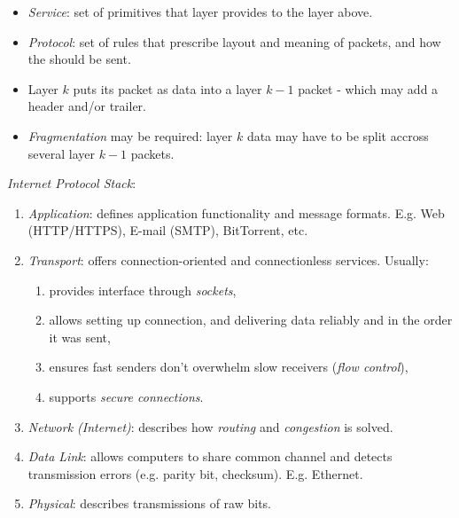 \documentclass[twocolumn,english]{article}
\begin{document}
\begin{itemize}
\item \emph{Service}: set of primitives that layer provides to the layer
above.
\item \emph{Protocol}: set of rules that prescribe layout and meaning of
packets, and how the should be sent.
\item Layer $k$ puts its packet as data into a layer $k-1$ packet - which
may add a header and/or trailer.
\item \emph{Fragmentation} may be required: layer $k$ data may have to
be split accross several layer $k-1$ packets.
\end{itemize}
\emph{Internet Protocol Stack}:
\begin{enumerate}
\item \emph{Application}: defines application functionality and message
formats. E.g. Web (HTTP/HTTPS), E-mail (SMTP), BitTorrent, etc.
\item \emph{Transport}: offers connection-oriented and connectionless services.
Usually:
\begin{enumerate}
\item provides interface through \emph{sockets}, 
\item allows setting up connection, and delivering data reliably and in
the order it was sent,
\item ensures fast senders don't overwhelm slow receivers (\emph{flow control}),
\item supports \emph{secure connections}.
\end{enumerate}
\item \emph{Network (Internet)}: describes how \emph{routing} and \emph{congestion}
is solved.
\item \emph{Data Link}: allows computers to share common channel and detects
transmission errors (e.g. parity bit, checksum). E.g. Ethernet.
\item \emph{Physical}: describes transmissions of raw bits.
\end{enumerate}
\end{document}
